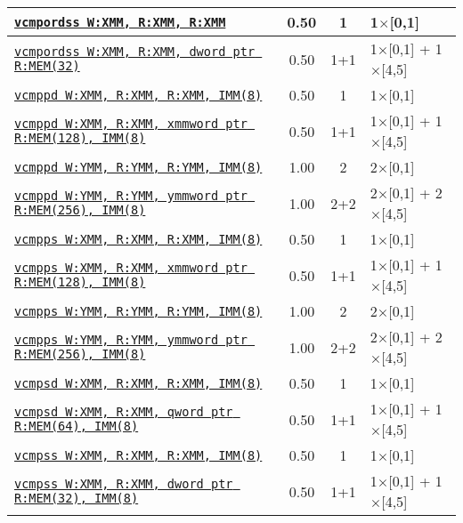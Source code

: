 \documentclass[a4paper,english,fontsize=9]{scrartcl}
\begin{document}
\begin{longtable}{p{}ccL{.25\textwidth}}
  \midrule
  \texttt{\href{https://felixcloutier.com/x86/CMPSS.html}{vcmpordss W:XMM, R:XMM, R:XMM}} & 0.50 & 1 & 1\(\times\)[0,1] \\
  \midrule
  \texttt{\href{https://felixcloutier.com/x86/CMPSS.html}{vcmpordss W:XMM, R:XMM, dword ptr R:MEM(32)}} & 0.50 & 1+1 & 1\(\times\)[0,1] + 1\(\times\)[4,5] \\
  \midrule
  \texttt{\href{https://felixcloutier.com/x86/CMPPD.html}{vcmppd W:XMM, R:XMM, R:XMM, IMM(8)}} & 0.50 & 1 & 1\(\times\)[0,1] \\
  \midrule
  \texttt{\href{https://felixcloutier.com/x86/CMPPD.html}{vcmppd W:XMM, R:XMM, xmmword ptr R:MEM(128), IMM(8)}} & 0.50 & 1+1 & 1\(\times\)[0,1] + 1\(\times\)[4,5] \\
  \midrule
  \texttt{\href{https://felixcloutier.com/x86/CMPPD.html}{vcmppd W:YMM, R:YMM, R:YMM, IMM(8)}} & 1.00 & 2 & 2\(\times\)[0,1] \\
  \midrule
  \texttt{\href{https://felixcloutier.com/x86/CMPPD.html}{vcmppd W:YMM, R:YMM, ymmword ptr R:MEM(256), IMM(8)}} & 1.00 & 2+2 & 2\(\times\)[0,1] + 2\(\times\)[4,5] \\
  \midrule
  \texttt{\href{https://felixcloutier.com/x86/CMPPS.html}{vcmpps W:XMM, R:XMM, R:XMM, IMM(8)}} & 0.50 & 1 & 1\(\times\)[0,1] \\
  \midrule
  \texttt{\href{https://felixcloutier.com/x86/CMPPS.html}{vcmpps W:XMM, R:XMM, xmmword ptr R:MEM(128), IMM(8)}} & 0.50 & 1+1 & 1\(\times\)[0,1] + 1\(\times\)[4,5] \\
  \midrule
  \texttt{\href{https://felixcloutier.com/x86/CMPPS.html}{vcmpps W:YMM, R:YMM, R:YMM, IMM(8)}} & 1.00 & 2 & 2\(\times\)[0,1] \\
  \midrule
  \texttt{\href{https://felixcloutier.com/x86/CMPPS.html}{vcmpps W:YMM, R:YMM, ymmword ptr R:MEM(256), IMM(8)}} & 1.00 & 2+2 & 2\(\times\)[0,1] + 2\(\times\)[4,5] \\
  \midrule
  \texttt{\href{https://felixcloutier.com/x86/CMPSD.html}{vcmpsd W:XMM, R:XMM, R:XMM, IMM(8)}} & 0.50 & 1 & 1\(\times\)[0,1] \\
  \midrule
  \texttt{\href{https://felixcloutier.com/x86/CMPSD.html}{vcmpsd W:XMM, R:XMM, qword ptr R:MEM(64), IMM(8)}} & 0.50 & 1+1 & 1\(\times\)[0,1] + 1\(\times\)[4,5] \\
  \midrule
  \texttt{\href{https://felixcloutier.com/x86/CMPSS.html}{vcmpss W:XMM, R:XMM, R:XMM, IMM(8)}} & 0.50 & 1 & 1\(\times\)[0,1] \\
  \midrule
  \texttt{\href{https://felixcloutier.com/x86/CMPSS.html}{vcmpss W:XMM, R:XMM, dword ptr R:MEM(32), IMM(8)}} & 0.50 & 1+1 & 1\(\times\)[0,1] + 1\(\times\)[4,5] \\

\end{longtable}
\end{document}
